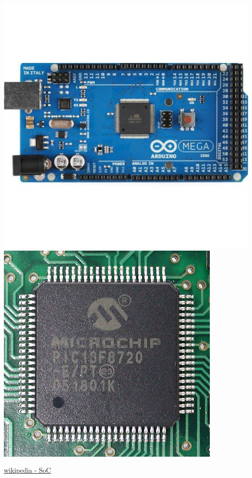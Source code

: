 \documentclass[fleqn]{beamer} %
\begin{document}
\begin{frame}[label=sectionI,containsverbatim]
\begin{itemize}
\begin{multicols}{2}
			\includegraphics[scale=.2]{mega2560.jpg}
			\includegraphics[scale=.1]{PIC18F8720.jpg}
			
			\end{multicols}
		\end{itemize}

	{\tiny \href{https://en.wikipedia.org/wiki/System_on_a_chip}{wikipedia - SoC} }

	\end{frame}
\end{document}
